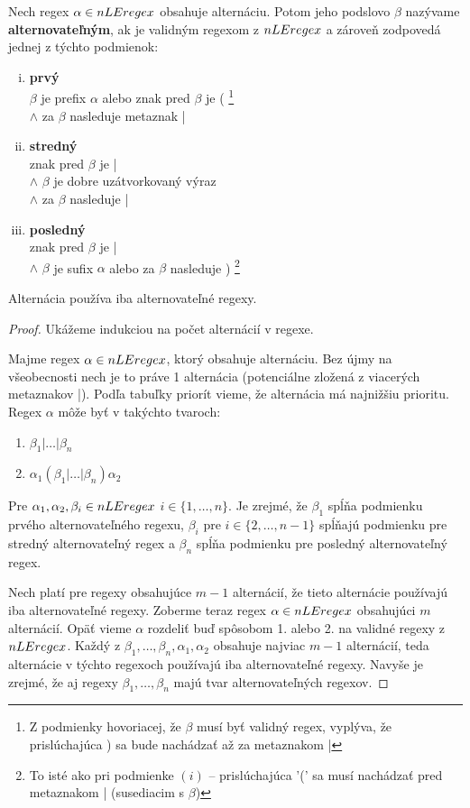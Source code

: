 \begin{df}
Nech regex $\alpha \in nLEregex$ obsahuje alternáciu. Potom jeho pod\-slovo $\beta$ nazývame \textbf{alternovateľným}, ak je validným regexom z $nLEregex$ a zároveň zodpovedá jednej z týchto podmienok:
\begin{enumerate}[(i)]
\item \textbf{prvý} \\ $\beta$ je prefix $\alpha$ alebo znak pred $\beta$ je ( \footnote{Z podmienky hovoriacej, že $\beta$ musí byť validný regex, vyplýva, že prislúchajúca ) sa bude nachádzať až za metaznakom |} 
\\ $\wedge$ za $\beta$ nasleduje metaznak |
\item \textbf{stredný} \\ znak pred $\beta$ je | \\ $\wedge$ $\beta$ je dobre uzátvorkovaný výraz \\ $\wedge$ za $\beta$ nasleduje |
\item \textbf{posledný} \\ znak pred $\beta$ je | \\
$\wedge$ $\beta$ je sufix $\alpha$ alebo za $\beta$ nasleduje ) \footnote{To isté ako pri podmienke $(i)$ -- prislúchajúca '(' sa musí nachádzať pred metaznakom | (susediacim s $\beta$)}
\end{enumerate}
\end{df}

\begin{lema}
Alternácia používa iba alternovateľné regexy.
\end{lema}
\begin{proof}
Ukážeme indukciou na počet alternácií v regexe.

Majme regex $\alpha \in nLEregex$, ktorý obsahuje alternáciu. Bez újmy na všeobecnosti nech je to práve 1 alternácia (potenciálne zložená z viacerých metaznakov |). Podľa tabuľky priorít vieme, že alternácia má najnižšiu prioritu. Regex $\alpha$ môže byť v takýchto tvaroch:
\begin{enumerate}
\item $\beta_1|\dots|\beta_n$
\item $\alpha_1(\beta_1|\dots|\beta_n)\alpha_2$
\end{enumerate}
Pre $\alpha_1,\alpha_2,\beta_i\in nLEregex$ $i\in\lbrace 1,\dots,n\rbrace$. Je zrejmé, že $\beta_1$ spĺňa podmienku prvého alternovateľného regexu, $\beta_i$ pre $i\in\lbrace 2,\dots,n-1\rbrace$ spĺňajú podmienku pre stredný alternovateľný regex a $\beta_n$ spĺňa podmienku pre posledný alternovateľný regex.

Nech platí pre regexy obsahujúce $m-1$ alternácií, že tieto alternácie používajú iba alternovateľné regexy. Zoberme teraz regex $\alpha \in nLEregex$ obsahujúci $m$ alternácií. Opäť vieme $\alpha$ rozdeliť buď spôsobom 1. alebo 2. na validné regexy z $nLEregex$. Každý z $\beta_1,\dots,\beta_n,\alpha_1,\alpha_2$ obsahuje najviac $m-1$ alternácií, teda alternácie v týchto regexoch používajú iba alternovateľné regexy. Navyše je zrejmé, že aj regexy $\beta_1,\dots,\beta_n$ majú tvar alternovateľných regexov.
\end{proof}

